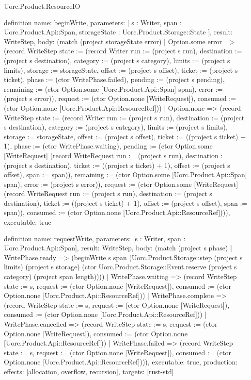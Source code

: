 \begin{lexlean}{Uorc.Product.ResourceIO}
\begin{semanticmodule}
definition{
  name: beginWrite,
  parameters: [
    s : Writer,
    span : Uorc.Product.Api::Span,
    storageState : Uorc.Product.Storage::State
  ],
  result: WriteStep,
  body: (match (project storageState error)
    | Option.some error => (record WriteStep {state := (record Writer {run := (project s run), destination := (project s destination), category := (project s category), limits := (project s limits), storage := storageState, offset := (project s offset), ticket := (project s ticket), phase := (ctor WritePhase.failed), pending := (project s pending), remaining := (ctor Option.some [Uorc.Product.Api::Span] span), error := (project s error)}), request := (ctor Option.none [WriteRequest]), consumed := (ctor Option.none [Uorc.Product.Api::ResourceRef])})
    | Option.none => (record WriteStep {state := (record Writer {run := (project s run), destination := (project s destination), category := (project s category), limits := (project s limits), storage := storageState, offset := (project s offset), ticket := ((project s ticket) + 1), phase := (ctor WritePhase.waiting), pending := (ctor Option.some [WriteRequest] (record WriteRequest {run := (project s run), destination := (project s destination), ticket := ((project s ticket) + 1), offset := (project s offset), span := span})), remaining := (ctor Option.some [Uorc.Product.Api::Span] span), error := (project s error)}), request := (ctor Option.some [WriteRequest] (record WriteRequest {run := (project s run), destination := (project s destination), ticket := ((project s ticket) + 1), offset := (project s offset), span := span})), consumed := (ctor Option.none [Uorc.Product.Api::ResourceRef])})),
  executable: true
}

definition{
  name: requestWrite,
  parameters: [s : Writer, span : Uorc.Product.Api::Span],
  result: WriteStep,
  body: (match (project s phase)
    | WritePhase.ready => (beginWrite s span (Uorc.Product.Storage::step (project s limits) (project s storage) (ctor Uorc.Product.Storage::Event.reserve (project s category) (project span length))))
    | WritePhase.waiting => (record WriteStep {state := s, request := (ctor Option.none [WriteRequest]), consumed := (ctor Option.none [Uorc.Product.Api::ResourceRef])})
    | WritePhase.complete => (record WriteStep {state := s, request := (ctor Option.none [WriteRequest]), consumed := (ctor Option.none [Uorc.Product.Api::ResourceRef])})
    | WritePhase.cancelled => (record WriteStep {state := s, request := (ctor Option.none [WriteRequest]), consumed := (ctor Option.none [Uorc.Product.Api::ResourceRef])})
    | WritePhase.failed => (record WriteStep {state := s, request := (ctor Option.none [WriteRequest]), consumed := (ctor Option.none [Uorc.Product.Api::ResourceRef])})),
  executable: true,
  production: {effects: [allocation, overflow, recursion], targets: [rust-std]}
}


\end{semanticmodule}
\end{lexlean}
